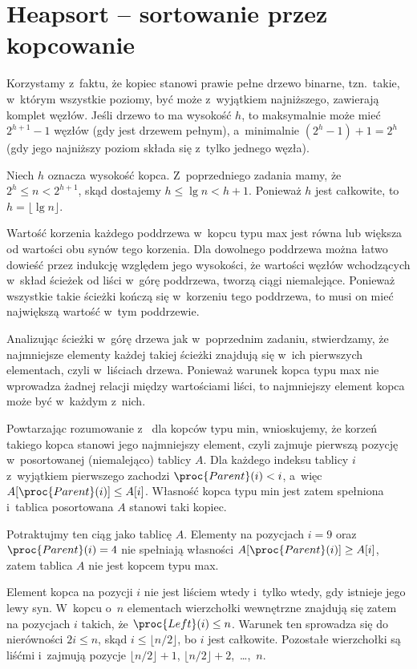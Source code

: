 \chapter{Heapsort -- sortowanie przez kopcowanie}


\exercise %
Korzystamy z~faktu, że kopiec stanowi prawie pełne drzewo binarne, tzn.\ takie, w~którym wszystkie poziomy, być może z~wyjątkiem najniższego, zawierają komplet węzłów. Jeśli drzewo to ma wysokość $h$, to maksymalnie może mieć $2^{h+1}-1$ węzłów (gdy jest drzewem pełnym), a~minimalnie $(2^h-1)+1=2^h$ (gdy jego najniższy poziom składa się z~tylko jednego węzła).

\exercise %
Niech $h$ oznacza wysokość kopca. Z~poprzedniego zadania mamy, że $2^h\le n<2^{h+1}$, skąd dostajemy $h\le\lg n<h+1$. Ponieważ $h$ jest całkowite, to $h=\lfloor\lg n\rfloor$.

\exercise %
Wartość korzenia każdego poddrzewa w~kopcu typu max jest równa lub większa od wartości obu synów tego korzenia. Dla dowolnego poddrzewa można łatwo dowieść przez indukcję względem jego wysokości, że wartości węzłów wchodzących w~skład ścieżek od liści w~górę poddrzewa, tworzą ciągi niemalejące. Ponieważ wszystkie takie ścieżki kończą się w~korzeniu tego poddrzewa, to musi on mieć największą wartość w~tym poddrzewie.

\exercise %
Analizując ścieżki w~górę drzewa jak w~poprzednim zadaniu, stwierdzamy, że najmniejsze elementy każdej takiej ścieżki znajdują się w~ich pierwszych elementach, czyli w~liściach drzewa. Ponieważ warunek kopca typu max nie wprowadza żadnej relacji między wartościami liści, to najmniejszy element kopca może być w~każdym z~nich.

\exercise %
Powtarzając rozumowanie z~ dla kopców typu min, wnioskujemy, że korzeń takiego kopca stanowi jego najmniejszy element, czyli zajmuje pierwszą pozycję w~posortowanej (niemalejąco) tablicy $A$. Dla każdego indeksu tablicy $i$ z~wyjątkiem pierwszego zachodzi $\proc{Parent}(i)<i$, a~więc $A[\proc{Parent}(i)]\le A[i]$. Własność kopca typu min jest zatem spełniona i~tablica posortowana $A$ stanowi taki kopiec.

\exercise %
Potraktujmy ten ciąg jako tablicę $A$. Elementy na pozycjach $i=9$ oraz $\proc{Parent}(i)=4$ nie spełniają własności $A[\proc{Parent}(i)]\ge A[i]$, zatem tablica $A$ nie jest kopcem typu max.

\exercise %
Element kopca na pozycji $i$ nie jest liściem wtedy i~tylko wtedy, gdy istnieje jego lewy syn. W~kopcu o~$n$ elementach wierzchołki wewnętrzne znajdują się zatem na pozycjach $i$ takich, że $\proc{Left}(i)\le n$. Warunek ten sprowadza się do nierówności $2i\le n$, skąd $i\le\lfloor n/2\rfloor$, bo $i$ jest całkowite. Pozostałe wierzchołki są liśćmi i~zajmują pozycje $\lfloor n/2\rfloor+1$, $\lfloor n/2\rfloor+2$,~\dots,~$n$.


